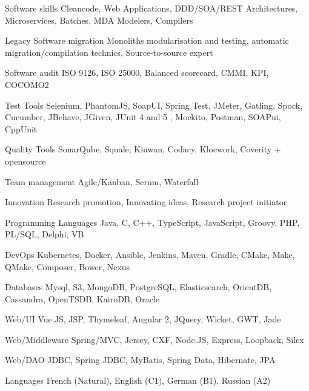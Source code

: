 

\begin{cvskills}

  \cvskill
  {Software skills} %
  {Cleancode, Web Applications, DDD/SOA/REST Architectures, Microservices, Batches, MDA Modelers, Compilers} %


  \cvskill
  {Legacy Software migration} %
  {Monoliths modularisation and testing, automatic migration/compilation technics, Source-to-source expert} %


  \cvskill
  {Software audit} %
  {ISO 9126, ISO 25000, Balanced scorecard, CMMI, KPI, COCOMO2} %

  \cvskill
  {Test Tools} %
  {Selenium, PhantomJS, SoapUI, Spring Test, JMeter, Gatling, Spock, Cucumber, JBehave, JGiven, JUnit 4 and 5 , Mockito, Postman, SOAPui, CppUnit} %

  \cvskill
  {Quality Tools} %
  {SonarQube, Squale, Kiuwan, Codacy, Klocwork, Coverity + opensource} %


  \cvskill
  {Team management} %
  {Agile/Kanban, Scrum, Waterfall} %

  \cvskill
  {Innovation} %
  {Research promotion, Innovating ideas, Research project initiator} %

  \cvskill
  {Programming Languages} %
  {Java, C, C++, TypeScript, JavaScript, Groovy, PHP, PL/SQL, Delphi, VB} %
  
  \cvskill
  {DevOps} %
  {Kubernetes, Docker, Ansible, Jenkins, Maven, Gradle, CMake, Make, QMake, Composer, Bower, Nexus} %
  
  \cvskill
  {Databases} %
  {Mysql, S3, MongoDB, PostgreSQL, Elasticsearch, OrientDB, Cassandra, OpenTSDB, KairoDB, Oracle} %
  
  \cvskill
  {Web/UI} %
  {Vue.JS, JSP, Thymeleaf, Angular 2, JQuery, Wicket, GWT, Jade} %
  
  \cvskill
  {Web/Middleware} %
  {Spring/MVC, Jersey, CXF, Node.JS, Express, Loopback, Silex} %
  
  
  \cvskill
  {Web/DAO} %
  {JDBC, Spring JDBC, MyBatis, Spring Data, Hibernate, JPA} %
  

  \cvskill
    {Languages} %
    {French (Natural), English (C1), German (B1), Russian (A2)} %

\end{cvskills}
